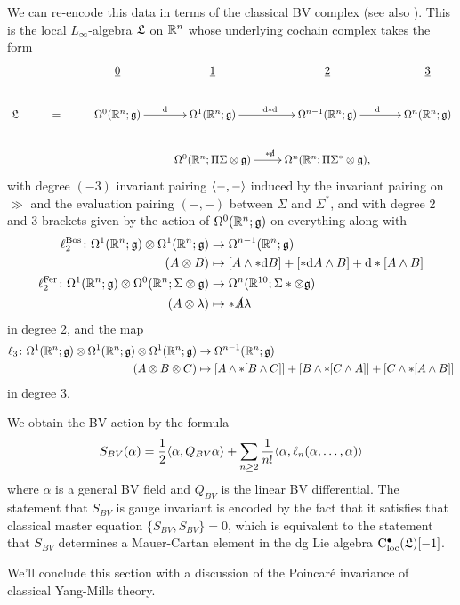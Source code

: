 \documentclass[10pt, oneside]{article}
\begin{document}
We can re-encode this data in terms of the classical BV complex (see also \cite[Section 3.1]{ElliottYoo1}).  
This is the local $L_\infty$-algebra $\mathfrak L$ on $\mathbb R^{n}$ whose underlying cochain complex takes the form
\[
\xymatrix{
& & \ul{0} & \ul{1} & \ul{2} & \ul{3} \\
\fL & = & \Omega^0(\RR^{n}; \gg) \ar[r]^{\d} &\Omega^1(\RR^{n}; \gg) \ar[r]^{\d \ast \d} &\Omega^{n-1}(\RR^{n}; \gg) \ar[r]^{\d} &\Omega^{n}(\RR^{n}; \gg) \\
& & &\Omega^0(\RR^{n}; \Pi \Sigma \otimes \gg) \ar[r]^{\ast \sd \d} &\Omega^{n}(\RR^{n}; \Pi \Sigma^* \otimes \gg), &
}\]
with degree $(-3)$ invariant pairing $\langle-,-\rangle$ induced by the invariant pairing on $\gg$ and the evaluation pairing $(-,-)$ between $\Sigma$ and $\Sigma^*$, and with degree 2 and 3 brackets given by the action of $\Omega^0(\mathbb R^{n}; \mathfrak{g})$ on everything along with
\begin{align*}
\ell_2^{\mathrm{Bos}} \colon \Omega^1(\mathbb R^{n};\mathfrak{g}) \otimes \Omega^1(\mathbb R^{n};\mathfrak{g}) &\to \Omega^{n-1}(\mathbb R^{n};\mathfrak{g}) \\
(A \otimes B) &\mapsto [A \wedge \ast \mathrm{d} B] + [\ast \mathrm{d}  A \wedge B] + \mathrm{d} \ast[A \wedge B] \\
\ell_2^{\mathrm{Fer}} \colon \Omega^1(\mathbb R^{n};\mathfrak{g}) \otimes \Omega^0(\mathbb R^{n}; \Sigma \otimes \mathfrak{g}) &\to \Omega^{n}(\mathbb R^{10}; \Sigma* \otimes \mathfrak{g}) \\
(A \otimes \lambda) &\mapsto \ast \slashed{A} \lambda
\end{align*}
in degree 2, and the map
\begin{align*}
\ell_3 \colon \Omega^1(\mathbb R^{n};\mathfrak{g}) \otimes \Omega^1(\mathbb R^{n};\mathfrak{g}) \otimes \Omega^1(\mathbb R^{n};\mathfrak{g}) &\to \Omega^{n-1}(\mathbb R^{n};\mathfrak{g}) \\
(A \otimes B \otimes C) &\mapsto [A \wedge \ast[B \wedge C]] + [B \wedge \ast[C \wedge A]] + [C \wedge \ast[A \wedge B]]
\end{align*}
in degree 3.

We obtain the BV action by the formula
\[
S_{BV} (\alpha) = \frac{1}{2} \langle\alpha , Q_{BV} \alpha\rangle + \sum_{n \geq 2} \frac{1}{n!} \langle\alpha, \ell_n(\alpha,\ldots, \alpha)\rangle 
\]
where $\alpha$ is a general BV field and $Q_{BV}$ is the linear BV differential. 
The statement that $S_{BV}$ is gauge invariant is encoded by the fact that it satisfies that classical master equation $\{S_{BV}, S_{BV}\} = 0$, which is equivalent to the statement that $S_{BV}$ determines a Mauer-Cartan element in the dg Lie algebra ${\rm C}_{\rm loc}^\bullet(\mathfrak L)[-1]$.

We'll conclude this section with a discussion of the Poincar\'e invariance of classical Yang-Mills theory.
\end{document}

